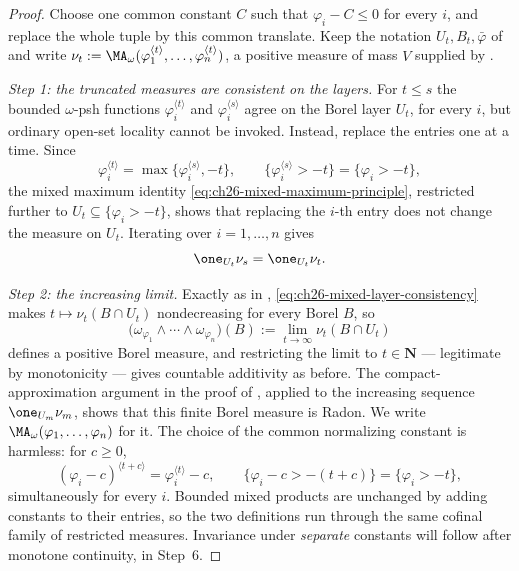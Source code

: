 \begin{proof}
Choose one common constant \(C\) such that \(\varphi_i-C\leq0\) for every
\(i\), and replace the whole tuple by this common translate.  Keep the
notation \(U_t,B_t,\bar\varphi\) of
 and write
\(\nu_t:=\MA_\omega(\varphi_1^{\langle t\rangle},\ldots,
\varphi_n^{\langle t\rangle})\), a positive measure of mass \(V\) supplied by
.

\emph{Step 1: the truncated measures are consistent on the layers.}  For
\(t\leq s\) the bounded \(\omega\)-psh functions
\(\varphi_i^{\langle t\rangle}\) and
\(\varphi_i^{\langle s\rangle}\) agree on the Borel layer \(U_t\), for
every \(i\), but ordinary open-set locality cannot be invoked.  Instead,
replace the entries one at a time.  Since
\[
 \varphi_i^{\langle t\rangle}
 =\max\{\varphi_i^{\langle s\rangle},-t\},
 \qquad
 \{\varphi_i^{\langle s\rangle}>-t\}=\{\varphi_i>-t\},
\]
the mixed maximum identity
\eqref{eq:ch26-mixed-maximum-principle}, restricted further to
\(U_t\subseteq\{\varphi_i>-t\}\), shows that replacing the \(i\)-th entry
does not change the measure on \(U_t\).  Iterating over \(i=1,\ldots,n\)
gives
\begin{equation}
\label{eq:ch26-mixed-layer-consistency}
 \one_{U_t}\nu_s=\one_{U_t}\nu_t .
\end{equation}

\emph{Step 2: the increasing limit.}  Exactly as in
, \eqref{eq:ch26-mixed-layer-consistency} makes
\(t\mapsto\nu_t(B\cap U_t)\) nondecreasing for every Borel \(B\), so
\begin{equation}
\label{eq:ch26-mixed-definition}
 \bigl(\omega_{\varphi_1}\wedge\cdots\wedge\omega_{\varphi_n}\bigr)(B)
 :=\lim_{t\to\infty}\nu_t(B\cap U_t)
\end{equation}
defines a positive Borel measure, and restricting the limit to
\(t\in\mathbf N\) --- legitimate by monotonicity --- gives countable
additivity as before.  The compact-approximation argument in the proof of
, applied to the increasing sequence
\(\one_{U_m}\nu_m\), shows that this finite Borel measure is Radon.  We write
\(\MA_\omega(\varphi_1,\ldots,\varphi_n)\) for it.  The choice of the common
normalizing constant is harmless: for \(c\geq0\),
\[
 (\varphi_i-c)^{\langle t+c\rangle}
   =\varphi_i^{\langle t\rangle}-c,
 \qquad
 \{\varphi_i-c>-(t+c)\}=\{\varphi_i>-t\},
\]
simultaneously for every \(i\).  Bounded mixed products are unchanged by
adding constants to their entries, so the two definitions run through the
same cofinal family of restricted measures.  Invariance under
\emph{separate} constants will follow after monotone continuity, in Step~6.


\end{proof}
